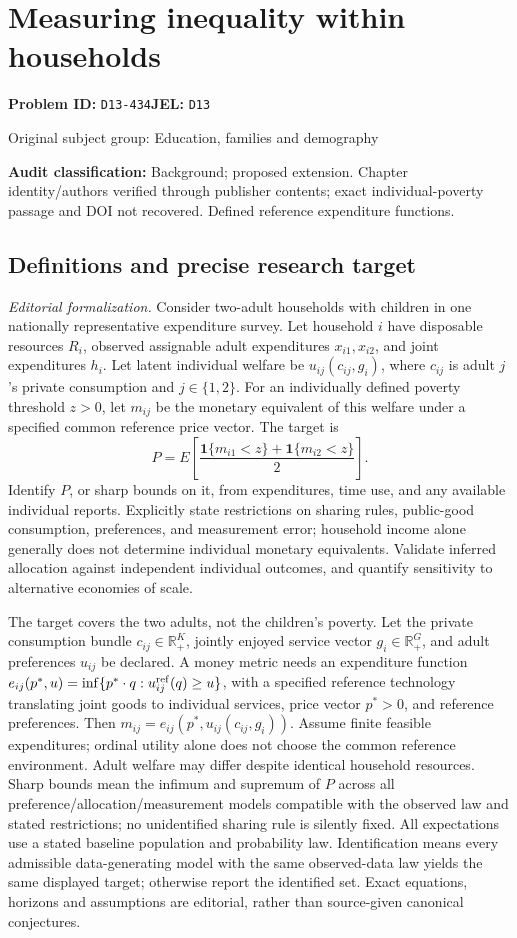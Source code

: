 \documentclass[11pt,a4paper]{article}
\begin{document}
\section*{Measuring inequality within households}
\textbf{Problem ID:} \texttt{D13-434}\quad \textbf{JEL:} \texttt{D13}\par
\label{problem:OP-0458}
{\sffamily\small\color{muted}Original subject group: Education, families and demography\par}
\label{definitions:problem:30007740}
\textbf{Audit classification:} Background; proposed extension. Chapter identity/authors verified through publisher contents; exact individual-poverty passage and DOI not recovered. Defined reference expenditure functions.
\subsection*{Definitions and precise research target}
\textit{Editorial formalization.} Consider two-adult households with children in one nationally representative expenditure survey. Let household \(i\) have disposable resources \(R_i\), observed assignable adult expenditures \(x_{i1},x_{i2}\), and joint expenditures \(h_i\). Let latent individual welfare be \(u_{ij}(c_{ij},g_i)\), where \(c_{ij}\) is adult \(j\)'s private consumption and \(j\in\{1,2\}\). For an individually defined poverty threshold \(z>0\), let \(m_{ij}\) be the monetary equivalent of this welfare under a specified common reference price vector. The target is
\[P=E\!\left[\frac{\mathbf1\{m_{i1}<z\}+\mathbf1\{m_{i2}<z\}}{2}\right].\]
Identify \(P\), or sharp bounds on it, from expenditures, time use, and any available individual reports. Explicitly state restrictions on sharing rules, public-good consumption, preferences, and measurement error; household income alone generally does not determine individual monetary equivalents. Validate inferred allocation against independent individual outcomes, and quantify sensitivity to alternative economies of scale.

The target covers the two adults, not the children's poverty. Let the private consumption bundle \(c_{ij}\in\mathbb R_+^K\), jointly enjoyed service vector \(g_i\in\mathbb R_+^G\), and adult preferences \(u_{ij}\) be declared. A money metric needs an expenditure function \(e_{ij}(p^*,u)=\inf\{p^*\cdot q:u_{ij}^{\rm ref}(q)\geq u\}\), with a specified reference technology translating joint goods to individual services, price vector \(p^*>0\), and reference preferences. Then \(m_{ij}=e_{ij}(p^*,u_{ij}(c_{ij},g_i))\). Assume finite feasible expenditures; ordinal utility alone does not choose the common reference environment. Adult welfare may differ despite identical household resources. Sharp bounds mean the infimum and supremum of \(P\) across all preference/allocation/measurement models compatible with the observed law and stated restrictions; no unidentified sharing rule is silently fixed. All expectations use a stated baseline population and probability law. Identification means every admissible data-generating model with the same observed-data law yields the same displayed target; otherwise report the identified set. Exact equations, horizons and assumptions are editorial, rather than source-given canonical conjectures.
\end{document}
